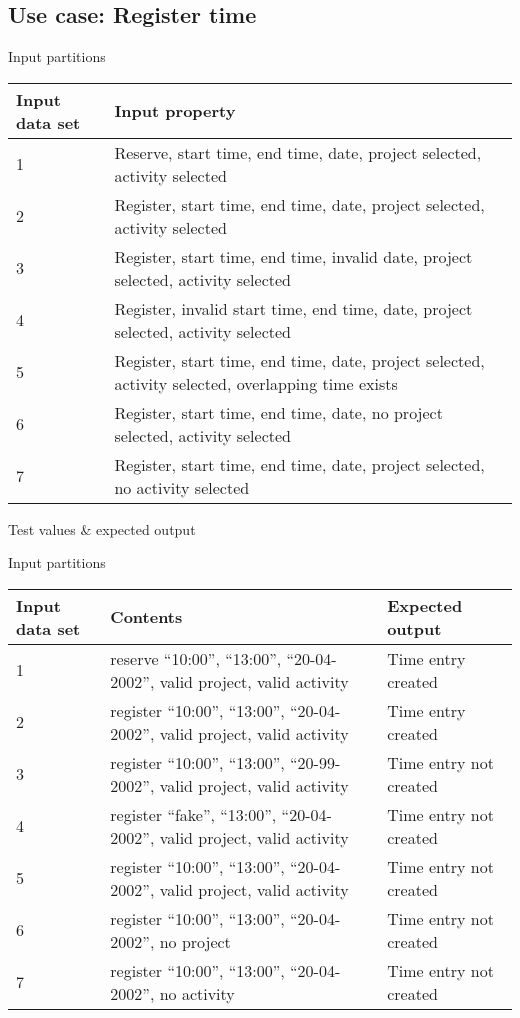 \subsection{Use case: Register time}

Input partitions
\begin{center}
  \begin{tabular}{| l | l |}
    \hline
	Input data set & Input property \\ \hline
     1 & Reserve,  start time, end time, date, project selected, activity selected \\ \hline
     2 & Register, start time, end time, date, project selected, activity selected \\ \hline
     3 & Register, start time, end time, invalid date, project selected, activity selected \\ \hline
     4 & Register, invalid start time, end time, date, project selected, activity selected \\ \hline
     5 & Register, start time, end time, date, project selected, activity selected, overlapping time exists \\ \hline
     6 & Register, start time, end time, date, no project selected, activity selected \\ \hline
     7 & Register, start time, end time, date, project selected, no activity selected \\ \hline
  \end{tabular}
\end{center}


Test values \& expected output

Input partitions
\begin{center}
  \begin{tabular}{| l | l | l |}
    \hline
	Input data set & Contents & Expected output \\ \hline
    1 & reserve  ``10:00'', ``13:00'', ``20-04-2002'', valid project, valid activity & Time entry created  \\ \hline
    2 & register ``10:00'', ``13:00'', ``20-04-2002'', valid project, valid activity & Time entry created  \\ \hline
    3 & register ``10:00'', ``13:00'', ``20-99-2002'', valid project, valid activity & Time entry not created  \\ \hline
    4 & register ``fake'',  ``13:00'', ``20-04-2002'', valid project, valid activity & Time entry not created  \\ \hline
    5 & register ``10:00'', ``13:00'', ``20-04-2002'', valid project, valid activity & Time entry not created  \\ \hline
    6 & register ``10:00'', ``13:00'', ``20-04-2002'', no project & Time entry not created  \\ \hline
    7 & register ``10:00'', ``13:00'', ``20-04-2002'', no activity & Time entry not created  \\ \hline
  \end{tabular}
\end{center}